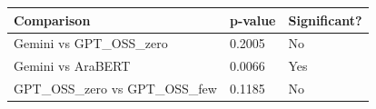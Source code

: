 \begin{tabular}{lll}
\toprule
Comparison & p-value & Significant? \\
\midrule
Gemini vs GPT_OSS_zero & 0.2005 & No \\
Gemini vs AraBERT & 0.0066 & Yes \\
GPT_OSS_zero vs GPT_OSS_few & 0.1185 & No \\
\bottomrule
\end{tabular}

